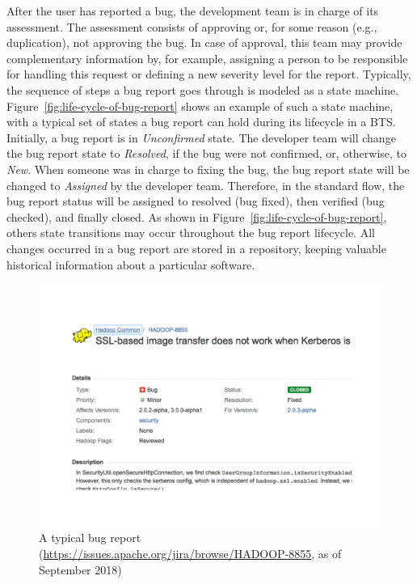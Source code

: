After the user has reported a bug, the development team is in charge of its assessment. The assessment consists of approving or, for some reason (e.g., duplication), not approving the bug. In case of approval, this team may provide complementary information by, for example, assigning a person to be responsible for handling this request or defining a new severity level for the report. Typically, the sequence of steps a bug report goes through is modeled as a state machine. Figure~\ref{fig:life-cycle-of-bug-report} shows an example of such a state machine, with a typical set of states a bug report can hold during its lifecycle in a BTS. Initially, a bug report is in \textit{Unconfirmed} state. The developer team will change the bug report state to \textit{Resolved}, if the bug were not confirmed, or, otherwise, to \textit{New}. When someone was in charge to fixing the bug, the bug report state will be changed to \textit{Assigned} by the developer team. Therefore, in the standard flow, the bug report status will be assigned to resolved (bug fixed), then verified (bug checked), and finally closed. As shown in Figure~\ref{fig:life-cycle-of-bug-report}, others state transitions may occur throughout the bug report lifecycle. All changes occurred in a bug report are stored in a repository, keeping valuable historical information about a particular software.

\begin{figure}[!tp]
  \centering
  \includegraphics[width=1\textwidth]{figures/bug-report-example.pdf}
  \caption{A typical bug report (\url{https://issues.apache.org/jira/browse/HADOOP-8855}, as of September 2018)} 
  \label{fig:bug-report-example}
\end{figure}

